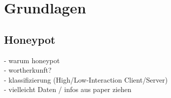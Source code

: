 \chapter{Grundlagen}
\label{ch:Grundlagen}


\section{Honeypot}
\label{sec:Honeypot}

- warum honeypot\\
- wortherkunft?\\
- klassifizierung (High/Low-Interaction Client/Server)\\

- vielleicht Daten / infos aus paper ziehen\\
